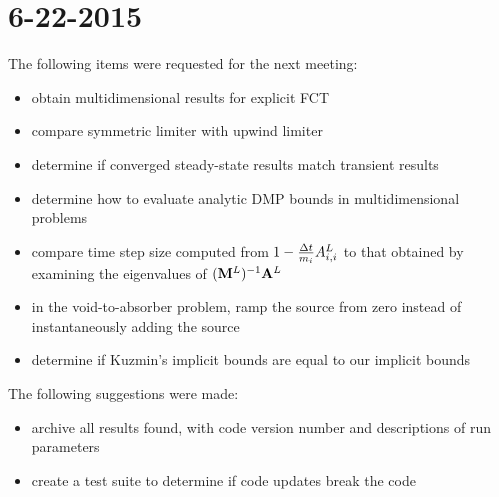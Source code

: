 \section*{6-22-2015}
The following items were requested for the next meeting:
\begin{itemize}
  \item obtain multidimensional results for explicit FCT
  \item compare symmetric limiter with upwind limiter
  \item determine if converged steady-state results match transient results
  \item determine how to evaluate analytic DMP bounds in multidimensional problems
  \item compare time step size computed from $1-\frac{\Delta t}{m_i}A^L_{i,i}$ to
    that obtained by examining the eigenvalues of $(\mathbf{M}^L)^{-1}\mathbf{A}^L$
  \item in the void-to-absorber problem, ramp the source from zero instead of
    instantaneously adding the source
  \item determine if Kuzmin's implicit bounds are equal to our implicit bounds
\end{itemize}

The following suggestions were made:
\begin{itemize}
  \item archive all results found, with code version number and descriptions of run parameters
  \item create a test suite to determine if code updates break the code
\end{itemize}
